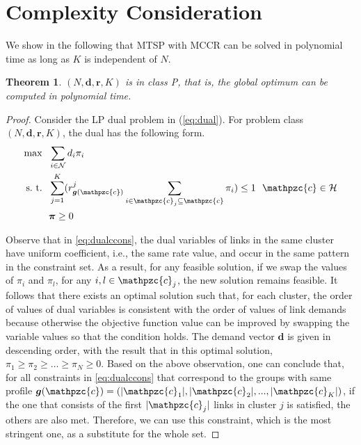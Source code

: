 \documentclass[10pt,onecolumn,journal,draftcls,oneside]{IEEEtran}
\newtheorem{theorem}{Theorem}
\newcounter{cond}
\newcounter{rema}
\newcommand{\CN}{\mathcal{N}}
\newcommand{\CH}{\mathcal{H}}
\newcommand{\Cc}{\mathpzc{c}}
\newcommand{\Bd}{\boldsymbol{d}}
\newcommand{\Br}{\boldsymbol{r}}
\newcommand{\Bg}{\boldsymbol{g}}
\newcommand{\Bpi}{\boldsymbol{\pi}}
\begin{document}
\section{Complexity Consideration}
\label{sec:complex}

We show in the following that MTSP with MCCR can be solved in polynomial time as long as $K$ is independent of $N$.

\begin{theorem}
\label{theo:polynomialM}
$(N, \Bd, \Br, K)$ is in class P, that is, the global optimum can be computed in polynomial time.
\end{theorem}

\begin{proof}
Consider the LP dual problem in (\ref{eq:dual}). For problem class $(N, \Bd, \Br, K)$, the dual has the following form.
\begin{subequations}
\label{eq:dualc}
\begin{align}
\max~~ & \sum_{i \in \CN} d_i \pi_i \label{eq:dualcobj}\\
\text{s.~t.}~~ & \sum_{j=1}^K (r^j_{\Bg(\Cc)} \sum_{i \in \Cc_j \subseteq \Cc} \pi_i) \leq 1~~\Cc\in \CH \label{eq:dualccons} \\
& \Bpi \geq 0
\end{align}
\end{subequations}

Observe that in \eqref{eq:dualccons}, the dual variables of links in the same cluster have uniform coefficient, i.e., the same rate value, and occur in the same pattern in the constraint set. As a result, for any feasible solution, if we swap the values of $\pi_i$ and $\pi_l$, for any $i, l \in \Cc_j$, the new solution remains feasible. It follows that there exists an optimal solution such that, for each cluster, the order of values of dual variables is consistent with the order of values of link demands because otherwise the objective function value can be improved by swapping the variable values so that the condition holds. The demand vector $\Bd$ is given in descending order, with the result that in this optimal solution, $\pi_1 \geq \pi_2 \geq \dots \geq \pi_N  \geq 0$. Based on the above observation, one can conclude that, for all constraints in \eqref{eq:dualccons} that correspond to the groups with same profile $\Bg(\Cc) = (|\Cc_1|, |\Cc_2|, ..., |\Cc_K|)$, if the one that consists of the first $|\Cc_j|$ links in cluster $j$ is satisfied, the others are also met. Therefore, we can use this constraint, which is the most stringent one, as a substitute for the whole set.


\end{proof}
\end{document}
